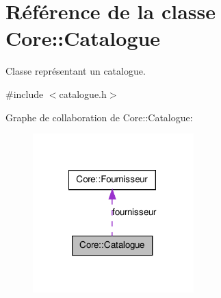 \hypertarget{class_core_1_1_catalogue}{
\section{Référence de la classe Core::Catalogue}
\label{de/d33/class_core_1_1_catalogue}
}


Classe représentant un catalogue.  




{\ttfamily \#include $<$catalogue.h$>$}



Graphe de collaboration de Core::Catalogue:\nopagebreak
\begin{figure}[H]
\begin{center}
\leavevmode
\includegraphics[width=176pt]{de/d4c/class_core_1_1_catalogue__coll__graph}
\end{center}
\end{figure}
